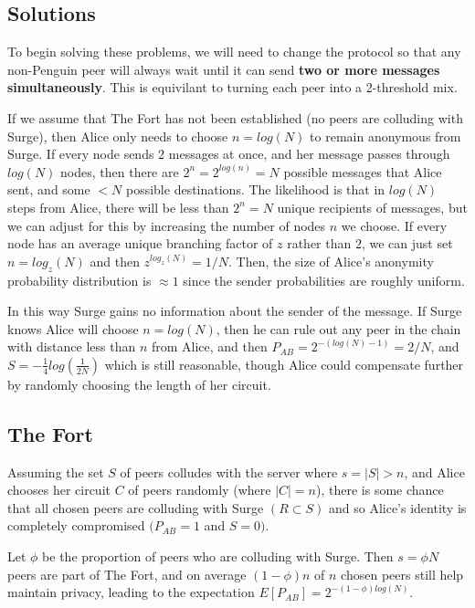 \documentclass[twocolumn,11pt,english]{article}
\begin{document}
\subsection{Solutions}
To begin solving these problems, we will need to change the protocol so that any non-Penguin peer will always wait until it can send \textbf{two or more messages simultaneously}. This is equivilant to turning each peer into a 2-threshold mix. \cite{TODO}

If we assume that The Fort has not been established (no peers are colluding with Surge), then Alice only needs to choose $n = log(N)$ to remain anonymous from Surge. If every node sends 2 messages at once, and her message passes through $log(N)$ nodes, then there are $2^n = 2^{log(n)} = N$ possible messages that Alice sent, and some $< N$ possible destinations. The likelihood is that in $log(N)$ steps from Alice, there will be less than $2^n = N$ unique recipients of messages, but we can adjust for this by increasing the number of nodes $n$ we choose. If every node has an average unique branching factor of $z$ rather than $2$, we can just set $n = log_z(N)$ and then $z^{log_z(N)} = 1/N$. Then, the size of Alice's anonymity probability distribution is $\approx 1$ since the sender probabilities are roughly uniform.

In this way Surge gains no information about the sender of the message. If Surge knows Alice will choose $n = log(N)$, then he can rule out any peer in the chain with distance less than $n$ from Alice, and then $P_{AB} = 2^{-(log(N)-1)} = 2/N$, and $S = - \frac{1}{4} log(\frac{1}{2N})$ which is still reasonable, though Alice could compensate further by randomly choosing the length of her circuit. 

\subsection{The Fort} Assuming the set $S$ of peers colludes with the server where $s = |S| > n$, and Alice chooses her circuit $C$ of peers randomly (where $|C| = n$), there is some chance that all chosen peers are colluding with Surge $(R \subset S)$ and so Alice's identity is completely compromised $(P_{AB} = 1$ and $S = 0)$. 

Let $\phi$ be the proportion of peers who are colluding with Surge. Then $s = \phi N$ peers are part of The Fort, and on average $(1 - \phi)n$ of $n$ chosen peers still help maintain privacy, leading to the expectation $E[P_{AB}] = 2^{-(1 - \phi) log(N)}$. 
\end{document}
